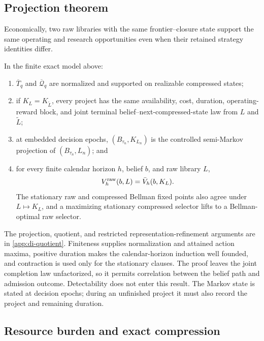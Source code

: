 \subsection{Projection theorem}

Economically, two raw libraries with the same frontier--closure state support
the same operating and research opportunities even when their retained
strategy identities differ.

\begin{theorem}
\label{thm:raw-to-compressed-projection}
In the finite exact model above:
\begin{enumerate}
  \item \(\overline T_q\) and \(\overline{\mathcal Q}_q\) are normalized and
    supported on realizable compressed states;
  \item if \(K_L=K_{\widetilde L}\), every project has the same availability,
    cost, duration, operating-reward block, and joint terminal
    belief--next-compressed-state law from \(L\) and \(\widetilde L\);
  \item at embedded decision epochs,
    \((B_{\tau_n},K_{L_n})\) is the controlled semi-Markov projection of
    \((B_{\tau_n},L_n)\); and
  \item for every finite calendar horizon \(h\), belief \(b\), and raw library
    \(L\),
    \[
      V_h^{\rm raw}(b,L)=\bar V_h(b,K_L).
    \]
    The stationary raw and compressed Bellman fixed points also agree under
    \(L\mapsto K_L\), and a maximizing stationary compressed selector lifts to
    a Bellman-optimal raw selector.
\end{enumerate}
\end{theorem}

The projection, quotient, and restricted representation-refinement arguments
are in \cref{app:di-quotient}.  Finiteness supplies normalization
and attained action maxima, positive duration makes the calendar-horizon
induction well founded, and contraction is used only for the stationary
clauses.  The proof leaves the joint completion law unfactorized, so it permits
correlation between the belief path and admission outcome.  Detectability does
not enter this result.  The Markov state is stated at decision epochs; during
an unfinished project it must also record the project and remaining duration.

\subsection{Resource burden and exact compression}
\label{subsec:retention-resources}

